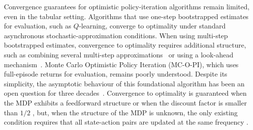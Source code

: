 %


Convergence guarantees for optimistic policy-iteration algorithms remain limited, even in the tabular setting.
Algorithms that use one-step bootstrapped estimates for evaluation, such as $Q$-learning, converge to optimality under standard asynchronous stochastic-approximation conditions.
When using multi-step bootstrapped estimates, convergence to optimality requires additional structure, such as combining several multi-step approximations~\citep{Harutyunyan2016QCorrections, Munos2016SafeLearning} or using a look-ahead mechanism~\citep{Winnicki2023OnEvaluation}.
Monte Carlo Optimistic Policy Iteration (MC-O-PI), which uses full-episode returns for evaluation, remains poorly understood. Despite its simplicity, the asymptotic behaviour of this foundational algorithm has been an open question for three decades~\citep{Sutton1999OpenLearning}.
Convergence to optimality is guaranteed when the MDP exhibits a feedforward structure \citep{Wang2022OnLearning, Lubars2021OptimisticStructure}
or when the discount factor is smaller than $1/2$ \citep{Delattre2025MarkovAlgorithm},
but, when the structure of the MDP is unknown, the only existing condition requires that all state-action pairs are updated at the same frequency \citep{Tsitsiklis2002OnIteration, Chen2018OnProblem, Liu2021OnStarts}.


